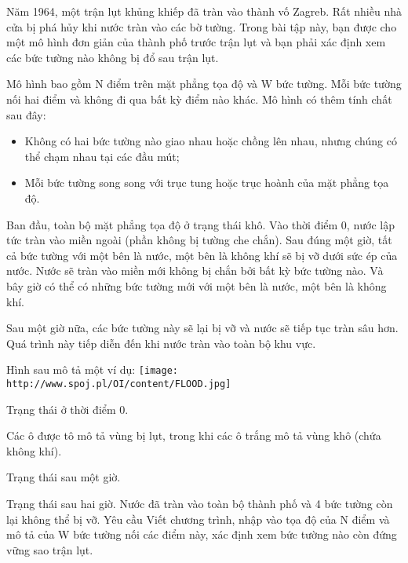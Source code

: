 Năm 1964, một trận lụt khủng khiếp đã tràn vào thành vố Zagreb. Rất nhiều nhà cửa bị phá hủy khi nước tràn vào các bờ tường. Trong bài tập này, bạn được cho một mô hình đơn giản của thành phố trước trận lụt và bạn phải xác định xem các bức tường nào không bị đổ sau trận lụt.  

   Mô hình bao gồm N điểm trên mặt phẳng tọa độ và W bức tường. Mỗi bức tường nối hai điểm và không đi qua bất kỳ điểm nào khác. Mô hình có thêm tính chất sau đây:  
\begin{itemize}
	\item     Không có hai bức tường nào giao nhau hoặc chồng lên nhau, nhưng chúng có thể chạm nhau tại các đầu mút;   
	\item     Mỗi bức tường song song với trục tung hoặc trục hoành của mặt phẳng tọa độ.   
\end{itemize}

   Ban đầu, toàn bộ mặt phẳng tọa độ ở trạng thái khô. Vào thời điểm 0, nước lập tức tràn vào miền ngoài (phần không bị tường che chắn). Sau đúng một giờ, tất cả bức tường với một bên là nước, một bên là không khí sẽ bị vỡ dưới sức ép của nước. Nước sẽ tràn vào miền mới không bị chắn bởi bất kỳ bức tường nào. Và bây giờ có thể có những bức tường mới với một bên là nước, một bên là không khí.  

   Sau một giờ nữa, các bức tường này sẽ lại bị vỡ và nước sẽ tiếp tục tràn sâu hơn. Quá trình này tiếp diễn đến khi nước tràn vào toàn bộ khu vực.  

   Hình sau mô tả một ví dụ:  
\texttt{[image: http://www.spoj.pl/OI/content/FLOOD.jpg]}

   Trạng thái ở thời điểm 0.  

   Các ô được tô mô tả vùng bị lụt, trong khi các ô trắng mô tả vùng khô (chứa không khí).  

   Trạng thái sau một giờ.  

   Trạng thái sau hai giờ. Nước đã tràn vào toàn bộ thành phố và 4 bức tường còn lại không thể bị vỡ.
   Yêu cầu  
Viết chương trình, nhập vào tọa độ của N điểm và mô tả của W bức tường nối các điểm này, xác định xem bức tường nào còn đứng vững sao trận lụt.